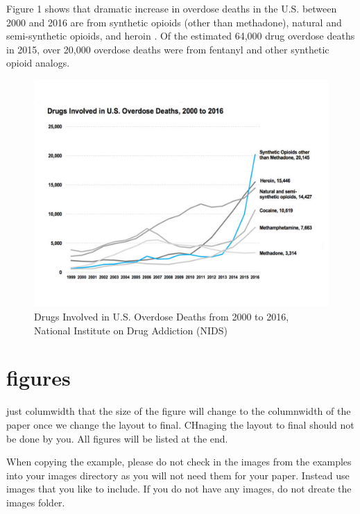 \documentclass[sigconf]{acmart}
\begin{document}
Figure 1 shows that dramatic 
increase in overdose deaths in the U.S. between 2000 and 2016 are from synthetic 
opioids (other than methadone), natural and semi-synthetic opioids, and heroin 
\cite{nida17}. Of the estimated 64,000 drug overdose deaths in 2015, over 
20,000 overdose deaths were from fentanyl and other synthetic opioid analogs. 


\begin{figure}[!ht]
  \centering\includegraphics[width=\columnwidth]{images/Figure5.pdf}
  \caption{Drugs Involved in U.S. Overdose Deaths from 2000 to 2016, 
  National Institute on Drug Addiction (NIDS) \cite{nida17}
  }\label{f:Figure5}
\end{figure}



\section{figures}

just columwidth that the size of the figure will change to the
columnwidth of the paper once we change the layout to final. CHnaging
the layout to final should not be done by you. All figures will be
listed at the end.


When copying the example, please do not check in the images from the
examples into your images directory as you will not need them for your
paper. Instead use images that you like to include. If you do not have
any images, do not dreate the images folder.
\end{document}
